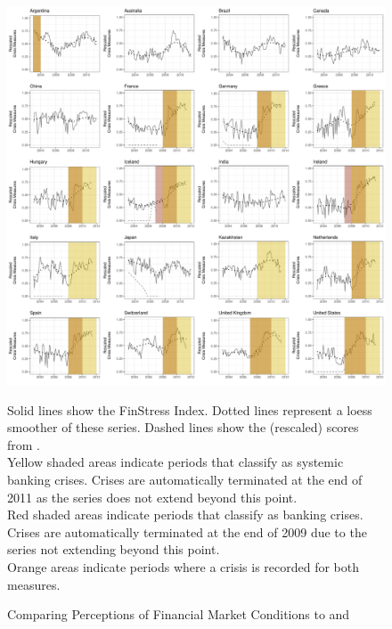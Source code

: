 \documentclass[]{article}
\begin{document}
\begin{figure}
    \caption{Comparing Perceptions of Financial Market Conditions to \cite{laeven2013} and \cite{Reinhart2009}}
    \label{compare_1}
    \begin{center}
        \includegraphics[scale=0.4]{figures/compare_to_lv_rr_short.pdf}
    \end{center}

    {\tiny{Solid lines show the FinStress Index. Dotted lines represent a loess smoother of these series. Dashed lines show the (rescaled) scores from \cite{Romer2015}. \\

    Yellow shaded areas indicate periods that \cite{laeven2013} classify as systemic banking crises. Crises are automatically terminated at the end of 2011 as the series does not extend beyond this point. \\

    Red shaded areas indicate periods that \cite{Reinhart2009} classify as banking crises. Crises are automatically terminated at the end of 2009 due to the series not extending beyond this point. \\

    Orange areas indicate periods where a crisis is recorded for both measures.}}
\end{figure}
\end{document}
